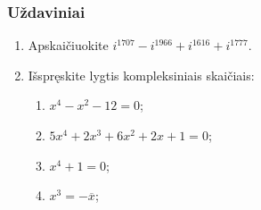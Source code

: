 \subsubsection{Uždaviniai}
\begin{enumerate}
\item Apskaičiuokite $i^{1707}-i^{1966}+i^{1616}+i^{1777}$.
\item Išspręskite lygtis kompleksiniais skaičiais:
	\begin{enumerate}
	\item $x^4-x^2-12=0$;
	\item $5 x^4+2 x^3+6 x^2+2 x+1= 0$;
	\item $x^4+1=0$;
	\item $x^3=-\overline{x}$;
	\end{enumerate}

\end{enumerate}
